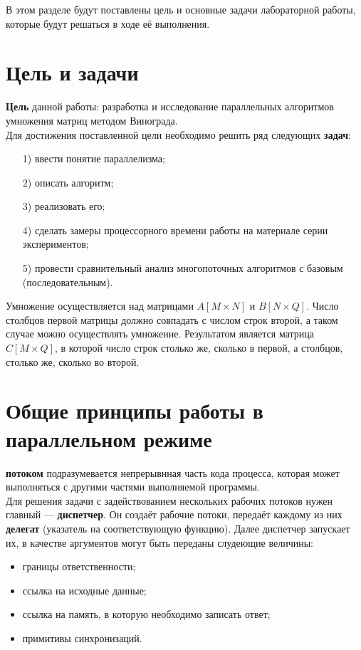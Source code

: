 В этом разделе будут поставлены цель и основные задачи лабораторной работы, которые будут решаться в ходе её выполнения.

\section{Цель и задачи}
\qquad\textbf{Цель} данной работы: разработка и исследование параллельных алгоритмов умножения матриц методом Винограда.\\

Для достижения поставленной цели необходимо решить ряд следующих \textbf{задач}:
\begin{enumerate}
	\item[1)] ввести понятие параллелизма;
	\item[2)] описать алгоритм;
	\item[3)] реализовать его;
	\item[4)] сделать замеры процессорного времени работы на материале серии экспериментов;
	\item[5)] провести сравнительный анализ многопоточных алгоритмов с базовым (последовательным).
\end{enumerate}

Умножение осуществляется над матрицами $A[M \times N]$ и $B[N \times Q]$. Число столбцов первой матрицы должно совпадать с числом строк второй, а таком случае можно осуществлять умножение. Результатом является матрица $C[M \times Q]$, в которой число строк столько же, сколько в первой, а столбцов, столько же, сколько во второй.

\section{Общие принципы работы в параллельном режиме}
 \textbf{потоком} подразумевается непрерывнная часть кода процесса, которая может выполняться с другими частями выполняемой программы.\\

Для решения задачи с задействованием нескольких рабочих потоков нужен главный --- \textbf{диспетчер}. Он создаёт рабочие потоки, передаёт каждому из них \textbf{делегат} (указатель на соответствующую функцию). Далее диспетчер запускает их, в качестве аргументов могут быть переданы слудеющие величины:
\begin{itemize}
	\item границы ответственности;
	\item ссылка на исходные данные;
	\item ссылка на память, в которую необходимо записать ответ;
	\item примитивы синхронизаций.
\end{itemize}


